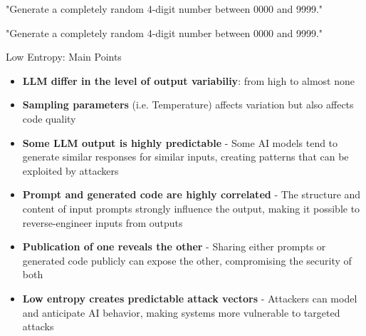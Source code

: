 \documentclass[aspectratio=169]{beamer}
\begin{document}
\begin{frame}{\small "Generate a completely random 4-digit number between 0000 and 9999."}
\begin{center}
\end{center}
\end{frame}

\begin{frame}{\small "Generate a completely random 4-digit number between 0000 and 9999."}
\begin{center}
\end{center}
\end{frame}

\begin{frame}{Low Entropy: Main Points}
\begin{itemize}
    \item \textbf{LLM differ in the level of output variabiliy}: from high to almost none
    \item \textbf{Sampling parameters} (i.e. Temperature) affects variation but also affects code quality
    \item \textbf{Some LLM output is highly predictable} - {\footnotesize Some AI models tend to generate similar responses for similar inputs, creating patterns that can be exploited by attackers}
    \item \textbf{Prompt and generated code are highly correlated} - {\footnotesize The structure and content of input prompts strongly influence the output, making it possible to reverse-engineer inputs from outputs}
    \item \textbf{Publication of one reveals the other} - {\footnotesize Sharing either prompts or generated code publicly can expose the other, compromising the security of both}
    \item \textbf{Low entropy creates predictable attack vectors} - {\footnotesize Attackers can model and anticipate AI behavior, making systems more vulnerable to targeted attacks}
\end{itemize}
\end{frame}
\end{document}
